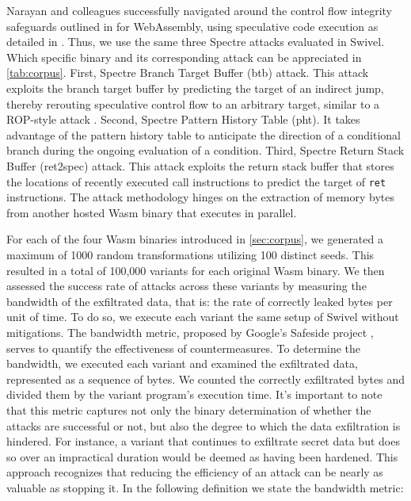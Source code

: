 \documentclass[sigplan,screen]{acmart}
\newcommand*\badge[1]{ \colorbox{red}{\color{white}#1}}
\newcommand{\wasm}{Wasm\xspace}
\newcommand{\Wasm}{WebAssembly\xspace}
\newcommand{\todo}[1]{%
\refstepcounter{todo}
\noindent\textbf{\badge{TODO}} {\color{red}#1}
\addcontentsline{td}{todo}
{\color{red}\thesection.\thetodo\xspace #1}}
\begin{document}
Narayan and colleagues successfully navigated around the control flow integrity safeguards outlined in \cite{Swivel} for \Wasm, using speculative code execution as detailed in \cite{Spectre}. 
Thus, we use the same three Spectre attacks evaluated in Swivel.
Which specific binary and its corresponding attack can be appreciated in \autoref{tab:corpus}.
First, Spectre Branch Target Buffer (btb) attack. 
This attack exploits the branch target buffer by predicting the target of an indirect jump, thereby rerouting speculative control flow to an arbitrary target, similar to a ROP-style attack \cite{?}.
Second, Spectre Pattern History Table (pht).
It takes advantage of the pattern history table to anticipate the direction of a conditional branch during the ongoing evaluation of a condition. 
Third, Spectre Return Stack Buffer (ret2spec) attack. 
This attack exploits the return stack buffer that stores the locations of recently executed call instructions to predict the target of \texttt{ret} instructions. 
The attack methodology hinges on the extraction of memory bytes from another hosted \wasm binary that executes in parallel.


For each of the four \wasm binaries introduced in \autoref{sec:corpus}, we generated a maximum of 1000 random transformations utilizing 100 distinct seeds. 
This resulted in a total of 100,000 variants for each original \wasm binary.
We then assessed the success rate of attacks across these variants by measuring the bandwidth of the exfiltrated data, that is: the rate of correctly leaked bytes per unit of time. 
To do so, we execute each variant the same setup of Swivel without mitigations.
The bandwidth metric, proposed by Google's Safeside project \cite{safeside}, serves to quantify the effectiveness of countermeasures.
To determine the bandwidth, we executed each variant and examined the exfiltrated data, represented as a sequence of bytes. 
We counted the correctly exfiltrated bytes and divided them by the variant program's execution time. 
It's important to note that this metric captures not only the binary determination of whether the attacks are successful or not, but also the degree to which the data exfiltration is hindered.
For instance, a variant that continues to exfiltrate secret data but does so over an impractical duration would be deemed as having been hardened. 
This approach recognizes that reducing the efficiency of an attack can be nearly as valuable as stopping it.
In the following definition we state the bandwidth metric:
\end{document}
